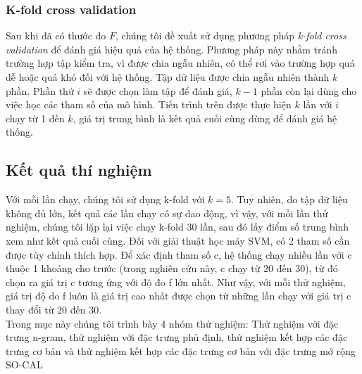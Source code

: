 \subsubsection*{K-fold cross validation}
Sau khi đã có thước đo \(F\), chúng tôi đề xuất sử dụng phương pháp \textit{k-fold cross validation} để đánh giá hiệu quả của hệ thống. Phương pháp này nhằm tránh trường hợp tập kiểm tra, vì được chia ngẫu nhiên, có thể rơi vào trường hợp quá dễ hoặc quá khó đối với hệ thống. Tập dữ liệu được chia ngẫu nhiên thành \(k\) phần. Phần thứ \(i\) sẽ được chọn làm tập để đánh giá, \(k-1\) phần còn lại dùng cho việc học các tham số của mô hình. Tiến trình trên được thực hiện \(k\) lần với \(i\) chạy từ 1 đến \(k\), giá trị trung bình là kết quả cuối cùng dùng để đánh giá hệ thống.

\subsection{Kết quả thí nghiệm}
Với mỗi lần chạy, chúng tôi sử dụng k-fold với $k=5$. Tuy nhiên, do tập dữ liệu không đủ lớn, kết quả các lần chạy có sự dao động, vì vậy, với mỗi lần thử nghiệm, chúng tôi lặp lại việc chạy k-fold 30 lần, sau đó lấy điểm số trung bình xem như kết quả cuối cùng. Đối với giải thuật học máy SVM, có 2 tham số cần được tùy chỉnh thích hợp. Để xác định tham số c, hệ thống chạy nhiều lần với c thuộc 1 khoảng cho trước (trong nghiên cứu này, c chạy từ 20 đến 30), từ đó chọn ra giá trị c tương ứng với độ đo f lớn nhất. Như vậy, với mỗi thử nghiệm, giá trị độ do f luôn là giá trị cao nhất được chọn từ những lần chạy với giá trị c thay đổi từ 20 đến 30. \\

Trong mục này chúng tôi trình bày 4 nhóm thử nghiệm: Thử nghiệm với đặc trưng n-gram, thử nghiệm với đặc trưng phủ định, thử nghiệm kết hợp các đặc trưng cơ bản và thử nghiệm kết hợp các đặc trưng cơ bản với đặc trưng mở rộng SO-CAL
